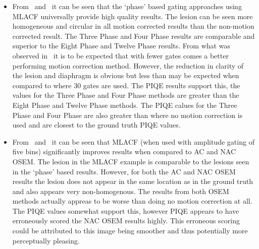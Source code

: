             \begin{itemize}
                \item From~ and~ it can be seen that the `phase' based gating approaches using \gls{MLACF} universally provide high quality results. The lesion can be seen more homogeneous and circular in all motion corrected results than the non-motion corrected result. The Three Phase and Four Phase results are comparable and superior to the Eight Phase and Twelve Phase results. From what was observed in~ it is to be expected that with fewer gates comes a better performing motion correction method. However, the reduction in clarity of the lesion and diaphragm is obvious but less than may be expected when compared to where $30$ gates are used. The \gls{PIQE} results support this, the values for the Three Phase and Four Phase methods are greater than the Eight Phase and Twelve Phase methods. The \gls{PIQE} calues for the Three Phase and Four Phase are also greater than where no motion correction is used and are closest to the ground truth \gls{PIQE} values.

                \item From~ and~ it can be seen that \gls{MLACF} (when used with amplitude gating of five bins) significantly improves results when compared to \gls{AC} and \gls{NAC} \gls{OSEM}. The lesion in the \gls{MLACF} example is comparable to the lesions seen in the `phase' based results. However, for both the \gls{AC} and \gls{NAC} \gls{OSEM} results the lesion does not appear in the same location as in the ground truth and also appears very non-homogenous. The results from both \gls{OSEM} methods actually appreas to be worse than doing no motion correction at all. The \gls{PIQE} values somewhat support this, however \gls{PIQE} appears to have erroneously scored the \gls{NAC} \gls{OSEM} results highly. This erroneous scoring could be attributed to this image being smoother and thus potentially more perceptually pleasing.


\end{itemize}
